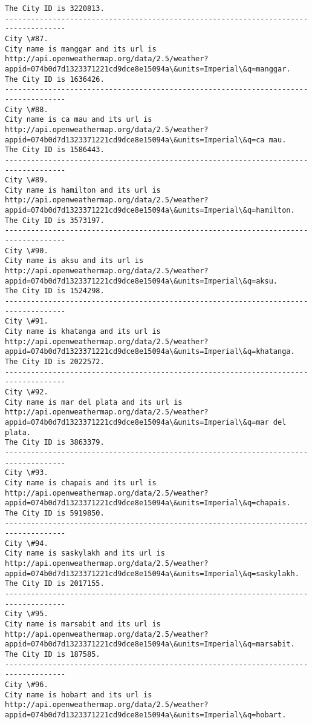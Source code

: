 \documentclass[11pt]{article}
\begin{document}
\begin{Verbatim}[commandchars=\\\{\}]
The City ID is 3220813.
------------------------------------------------------------------------------------
City \#87.
City name is manggar and its url is http://api.openweathermap.org/data/2.5/weather?appid=074b0d7d1323371221cd9dce8e15094a\&units=Imperial\&q=manggar.
The City ID is 1636426.
------------------------------------------------------------------------------------
City \#88.
City name is ca mau and its url is http://api.openweathermap.org/data/2.5/weather?appid=074b0d7d1323371221cd9dce8e15094a\&units=Imperial\&q=ca mau.
The City ID is 1586443.
------------------------------------------------------------------------------------
City \#89.
City name is hamilton and its url is http://api.openweathermap.org/data/2.5/weather?appid=074b0d7d1323371221cd9dce8e15094a\&units=Imperial\&q=hamilton.
The City ID is 3573197.
------------------------------------------------------------------------------------
City \#90.
City name is aksu and its url is http://api.openweathermap.org/data/2.5/weather?appid=074b0d7d1323371221cd9dce8e15094a\&units=Imperial\&q=aksu.
The City ID is 1524298.
------------------------------------------------------------------------------------
City \#91.
City name is khatanga and its url is http://api.openweathermap.org/data/2.5/weather?appid=074b0d7d1323371221cd9dce8e15094a\&units=Imperial\&q=khatanga.
The City ID is 2022572.
------------------------------------------------------------------------------------
City \#92.
City name is mar del plata and its url is http://api.openweathermap.org/data/2.5/weather?appid=074b0d7d1323371221cd9dce8e15094a\&units=Imperial\&q=mar del plata.
The City ID is 3863379.
------------------------------------------------------------------------------------
City \#93.
City name is chapais and its url is http://api.openweathermap.org/data/2.5/weather?appid=074b0d7d1323371221cd9dce8e15094a\&units=Imperial\&q=chapais.
The City ID is 5919850.
------------------------------------------------------------------------------------
City \#94.
City name is saskylakh and its url is http://api.openweathermap.org/data/2.5/weather?appid=074b0d7d1323371221cd9dce8e15094a\&units=Imperial\&q=saskylakh.
The City ID is 2017155.
------------------------------------------------------------------------------------
City \#95.
City name is marsabit and its url is http://api.openweathermap.org/data/2.5/weather?appid=074b0d7d1323371221cd9dce8e15094a\&units=Imperial\&q=marsabit.
The City ID is 187585.
------------------------------------------------------------------------------------
City \#96.
City name is hobart and its url is http://api.openweathermap.org/data/2.5/weather?appid=074b0d7d1323371221cd9dce8e15094a\&units=Imperial\&q=hobart.

\end{Verbatim}
\end{document}
